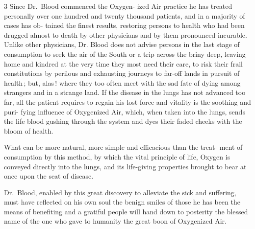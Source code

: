 \documentclass[10pt]{article}
\begin{document}
\begin{multicols}{3}
	Since Dr.~Blood commenced the Oxygen-\linebreak
	ized Air practice he has treated personally\linebreak
	over one hundred and twenty thousand\linebreak
	patients, and in a majority of cases has ob-\linebreak
	tained the finest results, restoring persons to\linebreak
	health who had been drugged almost to death\linebreak
	by other physicians and by them pronounced\linebreak
	incurable. Unlike other physicians, Dr.\linebreak
	Blood does not advise persons in the last\linebreak
	stage of consumption to seek the air of the\linebreak
	South or a trip across the briny deep, leaving\linebreak
	home and kindred at the very time they most\linebreak
	need their care, to risk their frail constitutions\linebreak
	by perilous and exhausting journeys to far-off\linebreak
	lands in pursuit of health\,; but, alas\,! where\linebreak
	they too often meet with the sad fate of dying\linebreak
	among strangers and in a strange land. If\linebreak
	the disease in the lungs has not advanced too\linebreak
	far, all the patient requires to regain his lost\linebreak
	force and vitality is the soothing and puri-\linebreak
	fying influence of Oxygenized Air, which,\linebreak
	when taken into the lungs, sends the life\linebreak
	blood gushing through the system and dyes their faded cheeks with the\linebreak
	bloom of health.

	What can be more natural, more simple and efficacious than the treat-\linebreak
	ment of consumption by this method, by which the vital principle of
	life,\linebreak
	Oxygen is conveyed directly into the lungs, and its life-giving
	properties\linebreak
	brought to bear at once upon the seat of disease.

	Dr.~Blood, enabled by this great discovery to alleviate the sick and\linebreak
	suffering, must have reflected on his own soul the benign smiles of
	those he\linebreak
	has been the means of benefiting and a gratiful people will hand
	down to\linebreak
	posterity the blessed name of the one who gave to humanity the great\linebreak
	boon of Oxygenized Air.
\end{multicols}
\end{document}
